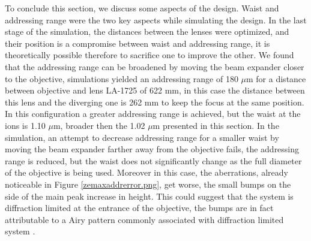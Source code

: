 %
%

To conclude this section, we discuss some aspects of the design. Waist and addressing range were the two key aspects while simulating the design. In the last stage of the simulation, the distances between the lenses were optimized, and their position is a compromise between waist and addressing range, it is theoretically possible therefore to sacrifice one to improve the other. We found that the addressing range can be broadened by moving the beam expander closer to the objective, simulations yielded an addressing range of 180 $\mu$m for a distance between objective and lens LA-1725 of 622 mm, in this case the distance between this lens and the diverging one is 262 mm to keep the focus at the same position. In this configuration a greater addressing range is achieved, but the waist at the ions is 1.10 $\mu$m, broader then the 1.02 $\mu$m presented in this section. In the simulation, an attempt to decrease addressing range for a smaller waist by moving the beam expander farther away from the objective fails, the addressing range is reduced, but the waist does not significantly change as the full diameter of the objective is being used. Moreover in this case, the aberrations, already noticeable in Figure \ref{zemaxaddrerror.png}, get worse, the small bumps on the side of the main peak increase in height. This could suggest that the system is diffraction limited at the entrance of the objective, the bumps are in fact attributable to a Airy pattern commonly associated with diffraction limited system \cite{dlimited}.
